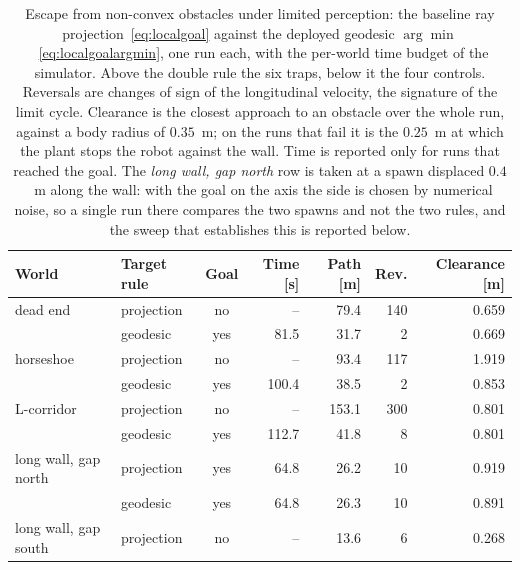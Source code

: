 \documentclass[11pt,a4paper]{article}
\begin{document}
\begin{table}[!ht]
  \centering
  \footnotesize
  \caption{Escape from non-convex obstacles under limited perception: the baseline ray
  projection~\eqref{eq:localgoal} against the deployed geodesic $\arg\min$~\eqref{eq:localgoalargmin}, one
  run each, with the per-world time budget of the simulator. Above the double rule the six traps, below it
  the four controls. Reversals are changes of sign of the longitudinal velocity, the signature of the limit
  cycle. Clearance is the closest approach to an obstacle over the whole run, against a body radius of
  $0.35$~m; on the runs that fail it is the $0.25$~m at which the plant stops the robot against the wall.
  Time is reported only for runs that reached the goal. The \emph{long wall, gap north} row is taken at a spawn
  displaced $0.4$~m along the wall: with the goal on the axis the side is chosen by numerical noise, so a
  single run there compares the two spawns and not the two rules, and the sweep that establishes this is
  reported below.}
  \label{tab:escape}
  \begin{tabular}{llcrrrr}
    \toprule
    World & Target rule & Goal & Time [s] & Path [m] & Rev. & Clearance [m] \\
    \midrule
    dead end                             & projection & no              &     -- &  79.4 &  140 & 0.659 \\
                                         & geodesic   & yes             &   81.5 &  31.7 &    2 & 0.669 \\
    \midrule
    horseshoe                            & projection & no              &     -- &  93.4 &  117 & 1.919 \\
                                         & geodesic   & yes             &  100.4 &  38.5 &    2 & 0.853 \\
    \midrule
    L-corridor                           & projection & no              &     -- & 153.1 &  300 & 0.801 \\
                                         & geodesic   & yes             &  112.7 &  41.8 &    8 & 0.801 \\
    \midrule
    long wall, gap north                 & projection & yes             &   64.8 &  26.2 &   10 & 0.919 \\
                                         & geodesic   & yes             &   64.8 &  26.3 &   10 & 0.891 \\
    \midrule
    long wall, gap south                 & projection & no              &     -- &  13.6 &    6 & 0.268 \\

\end{tabular}
\end{table}
\end{document}
